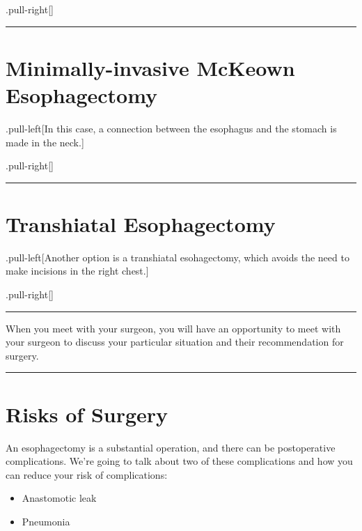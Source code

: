 \documentclass[
]{article}
\providecommand{\tightlist}{%
  \setlength{\itemsep}{0pt}\setlength{\parskip}{0pt}}
\begin{document}
.pull-right{[}{]}

\begin{center}\rule{0.5\linewidth}{0.5pt}\end{center}

\hypertarget{minimally-invasive-mckeown-esophagectomy}{%
\section{Minimally-invasive McKeown
Esophagectomy}\label{minimally-invasive-mckeown-esophagectomy}}

.pull-left{[}In this case, a connection between the esophagus and the
stomach is made in the neck.{]}

.pull-right{[}{]}

\begin{center}\rule{0.5\linewidth}{0.5pt}\end{center}

\hypertarget{transhiatal-esophagectomy}{%
\section{Transhiatal Esophagectomy}\label{transhiatal-esophagectomy}}

.pull-left{[}Another option is a transhiatal esohagectomy, which avoids
the need to make incisions in the right chest.{]}

.pull-right{[}{]}

\begin{center}\rule{0.5\linewidth}{0.5pt}\end{center}

When you meet with your surgeon, you will have an opportunity to meet
with your surgeon to discuss your particular situation and their
recommendation for surgery.

\begin{center}\rule{0.5\linewidth}{0.5pt}\end{center}

\hypertarget{risks-of-surgery}{%
\section{Risks of Surgery}\label{risks-of-surgery}}

An esophagectomy is a substantial operation, and there can be
postoperative complications. We're going to talk about two of these
complications and how you can reduce your risk of complications:

\begin{itemize}
\tightlist
\item
  Anastomotic leak
\item
  Pneumonia
\end{itemize}
\end{document}
